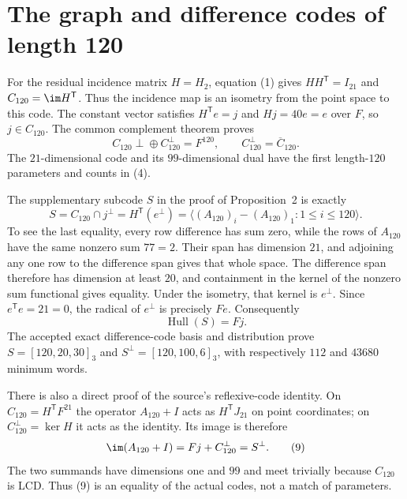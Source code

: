 \section{The graph and difference codes of length 120}

For the residual incidence matrix $H=H_2$, equation (1) gives
$HH^{\mathsf T}=I_{21}$ and $C_{120}=\im H^{\mathsf T}$. Thus the
incidence map is an isometry from the point space to this code. The
constant vector satisfies $H^{\mathsf T}e=j$ and $Hj=40e=e$ over $F$,
so $j\in C_{120}$. The common complement theorem proves
\[
 C_{120}\mathbin{\perp\!\oplus}C_{120}^{\perp}=F^{120},
 \qquad C_{120}^{\perp}=\overline C_{120}.
\]
The $21$-dimensional code and its $99$-dimensional dual have the first
length-$120$ parameters and counts in (4).

The supplementary subcode $S$ in the proof of Proposition~2 is exactly
\[
 S=C_{120}\cap j^\perp=H^{\mathsf T}(e^\perp)
   =\langle(A_{120})_i-(A_{120})_1:1\leq i\leq120\rangle.       \tag{7}
\]
To see the last equality, every row difference has sum zero, while the
rows of $A_{120}$ have the same nonzero sum $77=2$. Their span has
dimension $21$, and adjoining any one row to the difference span gives
that whole space. The difference span therefore has dimension at least
$20$, and containment in the kernel of the nonzero sum functional gives
equality. Under the isometry, that kernel is $e^\perp$.
Since $e^{\mathsf T}e=21=0$, the radical of $e^\perp$ is precisely $Fe$.
Consequently
\[
 \operatorname{Hull}(S)=Fj.                                   \tag{8}
\]
The accepted exact difference-code basis and distribution prove
$S=[120,20,30]_3$ and $S^\perp=[120,100,6]_3$, with respectively
$112$ and $43680$ minimum words.

There is also a direct proof of the source's reflexive-code identity.
On $C_{120}=H^{\mathsf T}F^{21}$ the operator $A_{120}+I$ acts as
$H^{\mathsf T}J_{21}$ on point coordinates; on $C_{120}^\perp=\ker H$
it acts as the identity. Its image is therefore
\[
 \im(A_{120}+I)=Fj+C_{120}^\perp=S^\perp.                     \tag{9}
\]
The two summands have dimensions one and $99$ and meet trivially because
$C_{120}$ is LCD. Thus (9) is an equality of the actual codes, not a match
of parameters.


